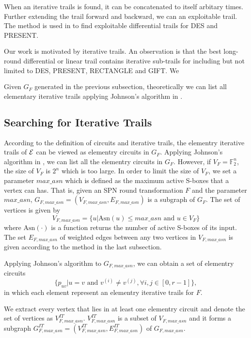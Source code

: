 When an iterative trails is found, it can be concatenated to itself arbitary times. Further extending the trail forward and backward, we can an exploitable trail. The method is used in \cite{BS91,BS92,W08} to find exploitable differential trails for DES and PRESENT. 

Our work is motivated by iterative trails. An observation is that the best long-round differential or linear trail contains iterative sub-trails for including but not limited to DES, PRESENT, RECTANGLE and GIFT. We 

Given $G_F$ generated in the previous subsection, theoretically we can list all elementary iterative trails applying Johnson's algorithm in \cite{J75}. 

\subsection{Searching for Iterative Trails\label{subsec:iterative-trails}}

According to the definition of circuits and iterative trails, the elementry iterative trails of $\mathcal{E}$ can be viewed as elementry circuits in $G_F$. Applying Johnson's algorithm in \cite{J75}, we can list all the elementry circuits in $G_F$. However, if $V_F=\mathbb{F}_2^n$, the size of $V_F$ is $2^n$ which is too large. In order to limit the size of $V_F$, we set a parameter $max\_asn$ which is defined as the maximum active S-boxes that a vertex can has. That is, given an SPN round transformation $F$ and the parameter $max\_asn$, $G_{F,max\_asn}=(V_{F,max\_asn},E_{F,max\_asn})$ is a subgraph of $G_F$. The set of vertices is given by
\[
    V_{F,max\_asn}=\{u|\text{Asn}(u)\leq max\_asn \text{ and } u\in V_F\}
\]
where $\text{Asn}(\cdot)$ is a function returns the number of active S-boxes of its input. The set $E_{F,max\_asn}$ of weighted edges between any two vertices in $V_{F,max\_asn}$ is given according to the method in the last subsection. 

Applying Johnson's algorithm to $G_{F,max\_asn}$, we can obtain a set of elementry circuits
\[
    \{p_{uv}|u=v \text{ and } v^{(i)}\neq v^{(j)},\forall i,j\in[0,r-1]\},
\]
in which each element represent an elementry iterative trails for $F$. 

We extract every vertex that lies in at least one elementry circuit and denote the set of vertices as $V^{IT}_{F,max\_asn}$. $V^{IT}_{F,max\_asn}$ is a subset of $V_{F,max\_asn}$ and it forms a subgraph $G^{IT}_{F,max\_asn}=(V^{IT}_{F,max\_asn},E^{IT}_{F,max\_asn})$ of $G_{F,max\_asn}$. 

